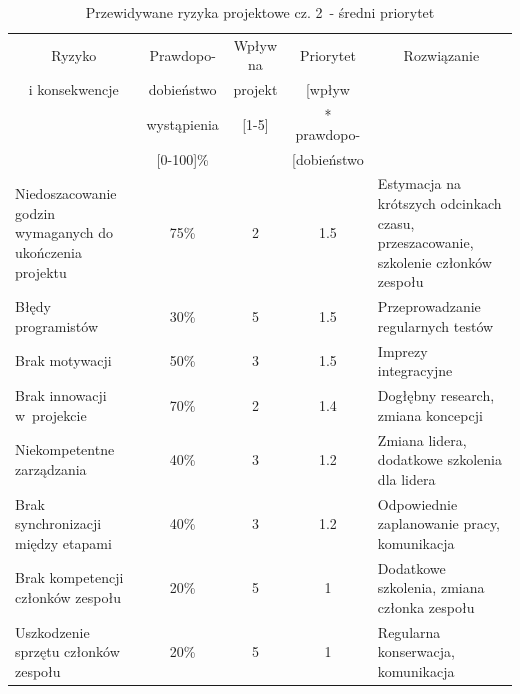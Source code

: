 \documentclass[a4paper,11pt]{article}
\begin{document}
\begin{table}[H]
	\centering
	\caption{Przewidywane ryzyka projektowe cz. 2~- średni priorytet}
	\bgroup
	\begin{tabular}{|p{5cm}|c|c|c|p{5cm}|}
	\hline
	\multicolumn{1}{|c|}{Ryzyko} & \multicolumn{1}{c|}{Prawdopo-} & \multicolumn{1}{c|}{Wpływ na} & \multicolumn{1}{c|}{Priorytet } & \multicolumn{1}{c|}{Rozwiązanie} \\
	\multicolumn{1}{|c|}{i konsekwencje} & \multicolumn{1}{c|}{dobieństwo} & \multicolumn{1}{c|}{projekt} & \multicolumn{1}{c|}{[wpływ} &  \\
	\multicolumn{1}{|c|}{} & \multicolumn{1}{c|}{wystąpienia} & \multicolumn{1}{c|}{[1-5]} & \multicolumn{1}{c|}{* prawdopo-} & \multicolumn{1}{c|}{} \\
	\multicolumn{1}{|c|}{} & \multicolumn{1}{c|}{[0-100]\%} & \multicolumn{1}{c|}{} & \multicolumn{1}{c|}{[dobieństwo} &  \\ \hline \hline
		
		Niedoszacowanie godzin wymaganych do ukończenia projektu & 75\% & 2 & 1.5 & Estymacja na krótszych odcinkach czasu, przeszacowanie, szkolenie członków zespołu
		\\ \hline
		Błędy programistów & 30\% & 5 & 1.5 & Przeprowadzanie regularnych testów
		\\ \hline
		Brak motywacji & 50\% & 3 & 1.5 & Imprezy integracyjne
		\\ \hline
		Brak innowacji w~projekcie & 70\% & 2 & 1.4 & Dogłębny research, zmiana koncepcji
		\\ \hline
		Niekompetentne zarządzania & 40\% & 3 & 1.2 & Zmiana lidera, dodatkowe szkolenia dla lidera
		\\ \hline
		Brak synchronizacji między etapami & 40\% & 3 & 1.2 & Odpowiednie zaplanowanie pracy, komunikacja
		\\ \hline
		Brak kompetencji członków zespołu & 20\% & 5 & 1 & Dodatkowe szkolenia, zmiana członka zespołu
		\\ \hline
		Uszkodzenie sprzętu członków zespołu & 20\% & 5 & 1 & Regularna konserwacja, komunikacja
		\\ \hline

		
		
		
		
		
	\end{tabular}
	\egroup
\end{table}
\end{document}
